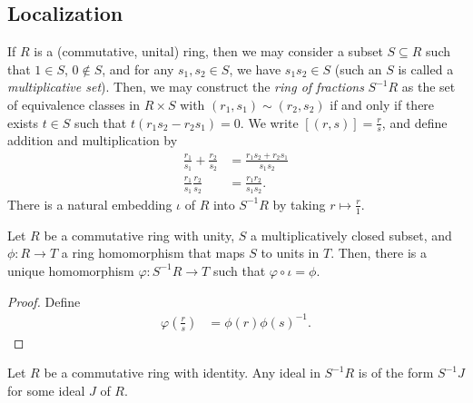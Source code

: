 \documentclass[10pt]{mypackage}
\begin{document}
\subsection{Localization}%
If $R$ is a (commutative, unital) ring, then we may consider a subset $S\subseteq R$ such that $1\in S$, $0\notin S$, and for any $s_1,s_2\in S$, we have $s_1s_2\in S$ (such an $S$ is called a \textit{multiplicative set}). Then, we may construct the \textit{ring of fractions} $S^{-1}R$ as the set of equivalence classes in $R\times S$ with $\left( r_1,s_1 \right)\sim \left( r_2,s_2 \right) $ if and only if there exists $t\in S$ such that $ t\left( r_1s_2 - r_2s_1 \right) = 0$. We write $\left[ \left( r,s \right) \right] = \frac{r}{s}$, and define addition and multiplication by
\begin{align*}
  \frac{r_1}{s_1} + \frac{r_2}{s_2} &= \frac{r_1s_2 + r_2s_1}{s_1s_2}\\
  \frac{r_1}{s_1}\frac{r_2}{s_2} &= \frac{r_1r_2}{s_1s_2}.
\end{align*}
There is a natural embedding $\iota$ of $R$ into $S^{-1}R$ by taking $r\mapsto \frac{r}{1}$. 
\begin{theorem}
  Let $R$ be a commutative ring with unity, $S$ a multiplicatively closed subset, and $\phi\colon R\rightarrow T$ a ring homomorphism that maps $S$ to units in $T$. Then, there is a unique homomorphism $\varphi\colon S^{-1}R\rightarrow T$ such that $\varphi\circ\iota = \phi$.
  \begin{center}
  \end{center}
\end{theorem}
\begin{proof}
  Define
  \begin{align*}
    \varphi\left( \frac{r}{s} \right) &= \phi\left( r \right)\phi\left( s \right)^{-1}.
  \end{align*}
\end{proof}
\begin{proposition}
  Let $R$ be a commutative ring with identity. Any ideal in $S^{-1}R$ is of the form $S^{-1}J$ for some ideal $J$ of $R$.
\end{proposition}
\end{document}
